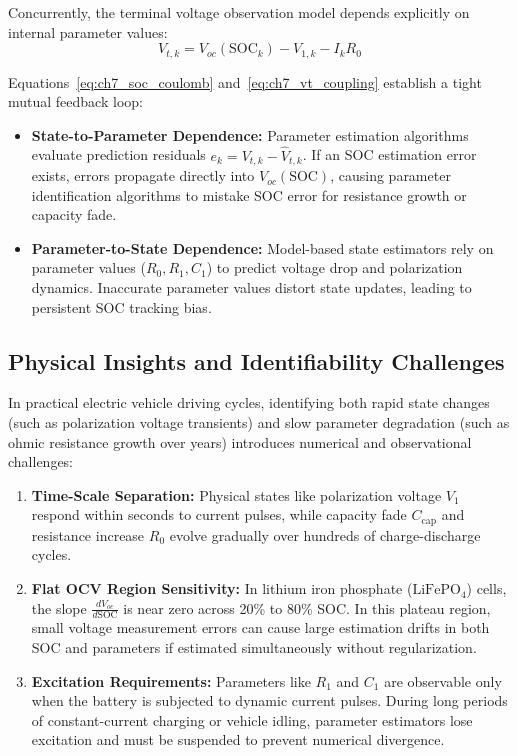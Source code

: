 Concurrently, the terminal voltage observation model depends explicitly on internal parameter values:
\begin{equation}
V_{t,k} = V_{oc}(\text{SOC}_k) - V_{1,k} - I_k R_0
\label{eq:ch7_vt_coupling}
\end{equation}

Equations~\eqref{eq:ch7_soc_coulomb} and~\eqref{eq:ch7_vt_coupling} establish a tight mutual feedback loop:
\begin{itemize}
    \item \textbf{State-to-Parameter Dependence:} Parameter estimation algorithms evaluate prediction residuals $e_k = V_{t,k} - \hat{V}_{t,k}$. If an SOC estimation error exists, errors propagate directly into $V_{oc}(\text{SOC})$, causing parameter identification algorithms to mistake SOC error for resistance growth or capacity fade.
    \item \textbf{Parameter-to-State Dependence:} Model-based state estimators rely on parameter values ($R_0, R_1, C_1$) to predict voltage drop and polarization dynamics. Inaccurate parameter values distort state updates, leading to persistent SOC tracking bias.
\end{itemize}

\subsection{Physical Insights and Identifiability Challenges}
In practical electric vehicle driving cycles, identifying both rapid state changes (such as polarization voltage transients) and slow parameter degradation (such as ohmic resistance growth over years) introduces numerical and observational challenges:
\begin{enumerate}
    \item \textbf{Time-Scale Separation:} Physical states like polarization voltage $V_1$ respond within seconds to current pulses, while capacity fade $C_{\text{cap}}$ and resistance increase $R_0$ evolve gradually over hundreds of charge-discharge cycles.
    \item \textbf{Flat OCV Region Sensitivity:} In lithium iron phosphate ($\text{LiFePO}_4$) cells, the slope $\frac{d V_{oc}}{d \text{SOC}}$ is near zero across 20\% to 80\% SOC. In this plateau region, small voltage measurement errors can cause large estimation drifts in both SOC and parameters if estimated simultaneously without regularization.
    \item \textbf{Excitation Requirements:} Parameters like $R_1$ and $C_1$ are observable only when the battery is subjected to dynamic current pulses. During long periods of constant-current charging or vehicle idling, parameter estimators lose excitation and must be suspended to prevent numerical divergence.
\end{enumerate}

